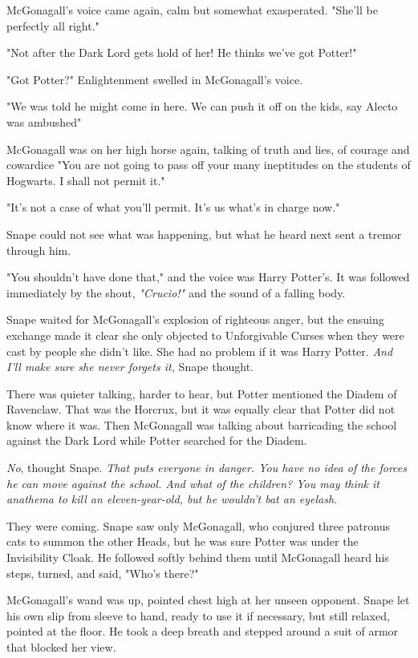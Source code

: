 McGonagall's voice came again, calm but somewhat exasperated. "She'll be perfectly all right."

"Not after the Dark Lord gets hold of her! He thinks we've got Potter!"

"Got Potter?" Enlightenment swelled in McGonagall's voice.

"We was told he might come in here. We can push it off on the kids, say Alecto was ambushed{\el}"

McGonagall was on her high horse again, talking of truth and lies, of courage and cowardice{\el} "You are not going to pass off your many ineptitudes on the students of Hogwarts. I shall not permit it."

"It's not a case of what you'll permit. It's us what's in charge now."

Snape could not see what was happening, but what he heard next sent a tremor through him.

"You shouldn't have done that," and the voice was Harry Potter's. It was followed immediately by the shout, \emph{"Crucio!"} and the sound of a falling body.

Snape waited for McGonagall's explosion of righteous anger, but the ensuing exchange made it clear she only objected to Unforgivable Curses when they were cast by people she didn't like. She had no problem if it was Harry Potter. \emph{And I'll make sure she never forgets it,} Snape thought.

There was quieter talking, harder to hear, but Potter mentioned the Diadem of Ravenclaw. That was the Horcrux, but it was equally clear that Potter did not know where it was. Then McGonagall was talking about barricading the school against the Dark Lord while Potter searched for the Diadem.

\emph{No}, thought Snape. \emph{That puts everyone in danger. You have no idea of the forces he can move against the school. And what of the children? You may think it anathema to kill an eleven-year-old, but he wouldn't bat an eyelash}.

They were coming. Snape saw only McGonagall, who conjured three patronus cats to summon the other Heads, but he was sure Potter was under the Invisibility Cloak. He followed softly behind them until McGonagall heard his steps, turned, and said, "Who's there?"

McGonagall's wand was up, pointed chest high at her unseen opponent. Snape let his own slip from sleeve to hand, ready to use it if necessary, but still relaxed, pointed at the floor. He took a deep breath and stepped around a suit of armor that blocked her view.

